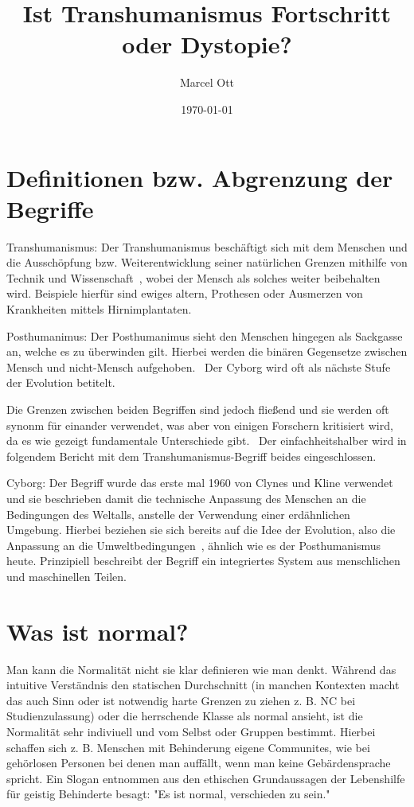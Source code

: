\documentclass[a4paper,
DIV=13,
12pt,
BCOR=10mm,
department=FakEI,
twoside,
parskip=half,
automark,
]{OTHRartcl}
\date{\today}
\title{Ist Transhumanismus Fortschritt oder Dystopie?}
\author{Marcel Ott}
\begin{document}
\maketitle

\section*{Definitionen bzw. Abgrenzung der Begriffe}

Transhumanismus: Der Transhumanismus beschäftigt sich mit dem Menschen und die Ausschöpfung bzw. Weiterentwicklung seiner natürlichen Grenzen mithilfe von Technik und Wissenschaft~\cite{Merzlyakov2022},
wobei der Mensch als solches weiter beibehalten wird. Beispiele hierfür sind ewiges altern, Prothesen oder Ausmerzen von Krankheiten mittels Hirnimplantaten.

Posthumanimus: Der Posthumanimus sieht den Menschen hingegen als Sackgasse an, welche es zu überwinden gilt. Hierbei werden die binären Gegensetze zwischen Mensch und nicht-Mensch aufgehoben.~\cite{Merzlyakov2022}
Der Cyborg wird oft als nächste Stufe der Evolution betitelt.

Die Grenzen zwischen beiden Begriffen sind jedoch fließend und sie werden oft synonm für einander verwendet, was aber von einigen Forschern kritisiert wird, da es wie gezeigt fundamentale Unterschiede gibt.~\cite{Merzlyakov2022}
Der ein­fach­heits­hal­ber wird in folgendem Bericht mit dem Transhumanismus-Begriff beides eingeschlossen.

Cyborg: Der Begriff wurde das erste mal 1960 von Clynes und Kline verwendet und sie beschrieben damit die technische Anpassung des Menschen an die Bedingungen des Weltalls, anstelle der Verwendung 
einer erdähnlichen Umgebung. Hierbei beziehen sie sich bereits auf die Idee der Evolution, also die Anpassung an die Umweltbedingungen~\cite{clynes1960cyborgs}, ähnlich wie es der Posthumanismus heute.
Prinzipiell beschreibt der Begriff ein integriertes System aus menschlichen und maschinellen Teilen.~\cite{warwick2000cyborg}


\section*{Was ist normal?}
Man kann die Normalität nicht sie klar definieren wie man denkt. Während das intuitive Verständnis den statischen Durchschnitt (in manchen Kontexten macht das auch Sinn oder ist notwendig harte Grenzen zu ziehen z. B. NC bei Studienzulassung)
oder die herrschende Klasse als normal ansieht, ist die Normalität sehr indiviuell und vom Selbst oder Gruppen bestimmt.\cite{schildmann1999normal} Hierbei schaffen sich z. B. Menschen mit Behinderung eigene Communites, wie bei gehörlosen
Personen bei denen man auffällt, wenn man keine Gebärdensprache spricht. Ein Slogan entnommen aus den ethischen Grundaussagen der Lebenshilfe für geistig Behinderte besagt: "Es ist normal, verschieden zu sein."\cite{lebenshilfe2021}
\end{document}
